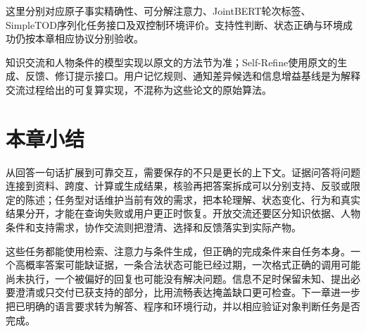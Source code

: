 \begin{fullwidth}
\raggedright
{}\par
{}\par
{}\par
{}\par
{}\par
{}\par
{}\par
\end{fullwidth}

这里分别对应原子事实精确性、可分解注意力、JointBERT轮次标签、SimpleTOD序列化任务接口及双控制环境评价。支持性判断、状态正确与环境成功仍按本章相应协议分别验收。

\begin{fullwidth}
\raggedright
{}\par
{}\par
{}\par
{}\par
\end{fullwidth}

知识交流和人物条件的模型实现以原文的方法节为准；Self-Refine使用原文的生成、反馈、修订提示接口。用户记忆规则、通知差异候选和信息增益基线是为解释交流过程给出的可复算实现，不混称为这些论文的原始算法。

\section{本章小结}
\label{sec:nlp-dialogue-summary}

从回答一句话扩展到可靠交互，需要保存的不只是更长的上下文。证据问答将问题连接到资料、跨度、计算或生成结果，核验再把答案拆成可以分别支持、反驳或限定的陈述；任务型对话维护当前有效的需求，把本轮理解、状态变化、行为和真实结果分开，才能在查询失败或用户更正时恢复。开放交流还要区分知识依据、人物条件和支持需求，协作交流则把澄清、选择和反馈落实到实际产物。

这些任务都能使用检索、注意力与条件生成，但正确的完成条件来自任务本身。一个高概率答案可能缺证据，一条合法状态可能已经过期，一次格式正确的调用可能尚未执行，一个被偏好的回复也可能没有解决问题。信息不足时保留未知、提出必要澄清或只交付已获支持的部分，比用流畅表达掩盖缺口更可检查。下一章进一步把已明确的语言要求转为解答、程序和环境行动，并以相应验证对象判断任务是否完成。
